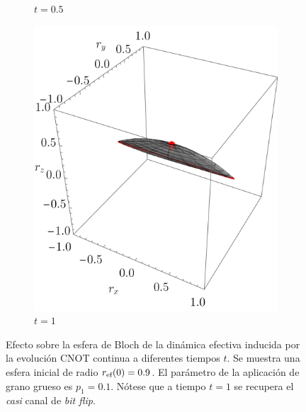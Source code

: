 \begin{figure}[ht!]
\begin{subfigure}{0.32\textwidth}
    \caption{$t=0.5$}
  \end{subfigure}
  \begin{subfigure}{0.32\textwidth}
    \centering
    \includegraphics[width=0.9\linewidth]{chapter3/figures_toy/CNOT_p=0.1_t=1._r=0.9.png}
    \caption{$t=1$}
  \end{subfigure}
  \caption{Efecto sobre la esfera de Bloch de la dinámica efectiva inducida por la evolución CNOT continua a diferentes tiempos $t$. Se muestra una esfera inicial de radio $r_{\text{ef}}(0)=0.9$. El parámetro de la aplicación de grano grueso es $p_{1}=0.1$. Nótese que a tiempo $t=1$ se recupera el \textit{casi} canal de \textit{bit flip}. \label{fig:AlmostBitFlipSequence}}
  \end{figure}

